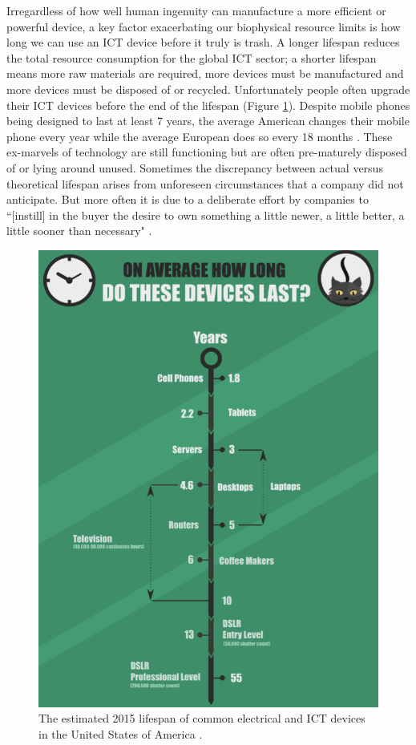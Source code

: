 \documentclass{article}
\begin{document}
Irregardless of how well human ingenuity can manufacture a more efficient or powerful device, a key factor exacerbating our biophysical resource limits is how long we can use an ICT device before it truly is trash. A longer lifespan reduces the total resource consumption for the global ICT sector; a shorter lifespan means more raw materials are required, more devices must be manufactured and more devices must be disposed of or recycled. Unfortunately people often upgrade their ICT devices before the end of the lifespan (Figure \ref{estimated_lifespan_ICT}). Despite mobile phones being designed to last at least 7 years, the average American changes their mobile phone every year while the average European does so every 18 months \cite{bournay2006vital, webfx2016lifespanICT}. These ex-marvels of technology are still functioning but are often pre-maturely disposed of or lying around unused. Sometimes the discrepancy between actual versus theoretical lifespan arises from unforeseen circumstances that a company did not anticipate. But more often it is due to a deliberate effort by companies to ``[instill] in the buyer the desire to own something a little newer, a little better, a little sooner than necessary" \cite{stevens1960planned}.

\begin{figure}[h]
    \includegraphics[width=.7 \textwidth]{./images/lifespan_ICT_US.png}
    \centering
    \caption{The estimated 2015 lifespan of common electrical and ICT devices in the United States of America \cite{webfx2016lifespanICT}.}
    \label{estimated_lifespan_ICT}
\end{figure}
\end{document}
